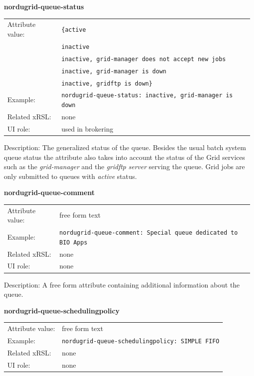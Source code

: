 \documentclass{article}
\begin{document}
  \hspace*{0.5cm}
  \begin{shaded}
    \textbf{nordugrid-queue-status}
  \end{shaded}
  \begin{tabular}{lp{10cm}}  
    Attribute value:& \verb#{active#\\
    & \verb#inactive#\\
    & \verb#inactive, grid-manager does not accept new jobs#\\
    & \verb#inactive, grid-manager is down#\\
    & \verb#inactive, gridftp is down}#\\
    Example:& \verb#nordugrid-queue-status: inactive, grid-manager is down#\\ 
    Related xRSL:& none\\
    UI role:& used in brokering\\
  \end{tabular}

Description: The generalized status of the queue. Besides the usual 
batch system queue status the attribute also takes into account the 
status of the Grid services such as the {\it grid-manager} and the {\it gridftp server} 
serving the queue. Grid jobs are only submitted to queues with {\it active} status.


  \hspace*{0.5cm}
  \begin{shaded}
    \textbf{nordugrid-queue-comment}
  \end{shaded}
  \begin{tabular}{lp{10cm}}  
    Attribute value:& free form text\\
    Example:& \verb#nordugrid-queue-comment: Special queue dedicated to BIO Apps#\\
    Related xRSL:& none\\
    UI role:& none\\
  \end{tabular}

Description: A free form attribute containing additional information about the 
queue.


  \hspace*{0.5cm}
  \begin{shaded}
    \textbf{nordugrid-queue-schedulingpolicy}
  \end{shaded}
  \begin{tabular}{lp{10cm}}  
    Attribute value:& free form text\\
    Example:& \verb#nordugrid-queue-schedulingpolicy: SIMPLE FIFO#\\
    Related xRSL:& none\\
    UI role:& none\\
  \end{tabular}
\end{document}
